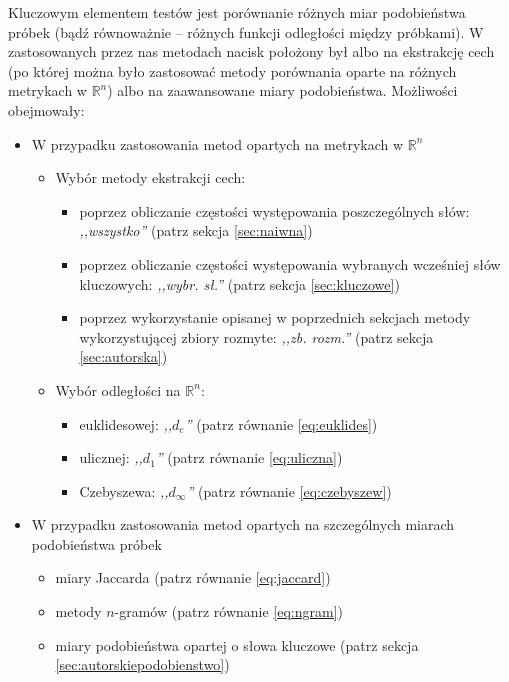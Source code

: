 \documentclass[a4paper]{classrep}
\begin{document}
Kluczowym elementem testów jest porównanie różnych miar podobieństwa próbek (bądź równoważnie
-- różnych funkcji odległości między próbkami). W zastosowanych przez nas metodach
nacisk położony był albo na ekstrakcję cech (po której można było zastosować metody
porównania oparte na różnych metrykach w $\mathbb{R}^n$) albo na zaawansowane miary podobieństwa.
Możliwości obejmowały:
\begin{itemize}
\renewcommand{\labelitemi}{$\bullet$}
\renewcommand{\labelitemii}{$\circ$}
\item W przypadku zastosowania metod opartych na metrykach w $\mathbb{R}^n$
\begin{itemize}
\item Wybór metody ekstrakcji cech:
\begin{itemize}
\item poprzez obliczanie częstości występowania poszczególnych słów: \emph{,,wszystko''} (patrz sekcja \ref{sec:naiwna}) 
\item poprzez obliczanie częstości występowania wybranych wcześniej słów kluczowych: \emph{,,wybr. sł.''} (patrz sekcja \ref{sec:kluczowe})
\item poprzez wykorzystanie opisanej w poprzednich sekcjach metody wykorzystującej zbiory rozmyte: \emph{,,zb. rozm.''} (patrz sekcja \ref{sec:autorska})
\end{itemize}
\item Wybór odległości na $\mathbb{R}^n$:
\begin{itemize}
\item euklidesowej: \emph{,,\(d_e\)''} (patrz równanie \ref{eq:euklides})
\item ulicznej: \emph{,,\(d_1\)''} (patrz równanie \ref{eq:uliczna}) 
\item Czebyszewa: \emph{,,\(d_\infty\)''} (patrz równanie \ref{eq:czebyszew}) 
\end{itemize}
\end{itemize}
\item W przypadku zastosowania metod opartych na szczególnych miarach podobieństwa próbek
\begin{itemize}
\item miary Jaccarda (patrz równanie \ref{eq:jaccard})
\item metody $n$-gramów (patrz równanie \ref{eq:ngram})
\item miary podobieństwa opartej o słowa kluczowe (patrz sekcja \ref{sec:autorskiepodobienstwo})
\end{itemize}
\end{itemize}
\end{document}
